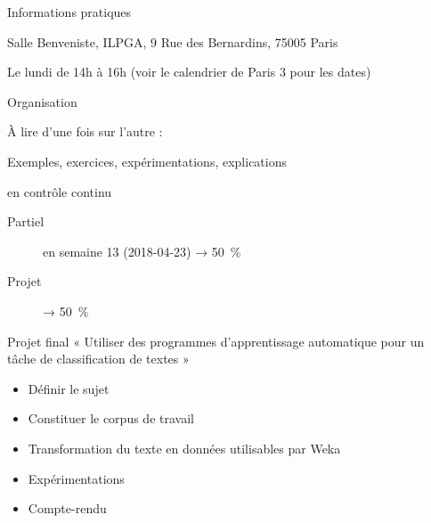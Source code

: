 \documentclass[hyperref={unicode}, xcolor={svgnames}]{beamer}
\title{\titlepagetitle}
\author{\textbf{\myname}}
\institute{}
\date{\conference\\\docdate}
\begin{document}

\begin{frame}[plain]
	\titlepage
\end{frame}

\begin{frame}{Informations pratiques}
    \begin{description}[Contact]
        \item[Où] Salle Benveniste, ILPGA, 9 Rue des Bernardins, 75005 Paris
        \item[Quand] Le lundi de 14h à 16h (voir le calendrier de Paris 3 pour les dates)
        \item[Contact] 
        \item[Web] {\small{}}
    \end{description}
\end{frame}

\begin{frame}{Organisation}
    \begin{description}[Évaluation]
        \item[Poly] À lire d'une fois sur l'autre :
                    {\footnotesize{}}
        \item[Cours] Exemples, exercices, expérimentations, explications
        \item[Évaluation] en contrôle continu
            \begin{description}
                \item[Partiel] en semaine 13 (2018-04-23) → \SI{50}{\percent}
                \item[Projet] → \SI{50}{\percent}
            \end{description}
    \end{description}
\end{frame}

\begin{frame}{Projet final}
    « Utiliser des programmes d'apprentissage automatique pour un tâche de classification de textes »
    \begin{itemize}
        \item Définir le sujet
        \item Constituer le corpus de travail
        \item Transformation du texte en données utilisables par Weka
        \item Expérimentations
        \item Compte-rendu
    \end{itemize}
\end{frame}
\end{document}

